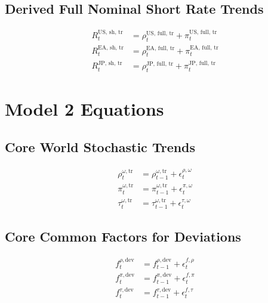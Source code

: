 \documentclass{article}
\begin{document}
\subsection*{Derived Full Nominal Short Rate Trends}
\begin{align}
    R^{\text{US, sh, tr}}_t &= \rho^{\text{US, full, tr}}_t + \pi^{\text{US, full, tr}}_t \\
    R^{\text{EA, sh, tr}}_t &= \rho^{\text{EA, full, tr}}_t + \pi^{\text{EA, full, tr}}_t \\
    R^{\text{JP, sh, tr}}_t &= \rho^{\text{JP, full, tr}}_t + \pi^{\text{JP, full, tr}}_t
\end{align}

\clearpage
\section*{Model 2 Equations} %

\subsection*{Core World Stochastic Trends}
\begin{align}
    \rho^{\omega, \text{tr}}_t &= \rho^{\omega, \text{tr}}_{t-1} + \epsilon^{\rho, \omega}_t \\
    \pi^{\omega, \text{tr}}_t &= \pi^{\omega, \text{tr}}_{t-1} + \epsilon^{\pi, \omega}_t \\
    \tau^{\omega, \text{tr}}_t &= \tau^{\omega, \text{tr}}_{t-1} + \epsilon^{\tau, \omega}_t
\end{align}

\subsection*{Core Common Factors for Deviations}
\begin{align}
    f^{\rho, \text{dev}}_t &= f^{\rho, \text{dev}}_{t-1} + \epsilon^{f, \rho}_t \\
    f^{\pi, \text{dev}}_t &= f^{\pi, \text{dev}}_{t-1} + \epsilon^{f, \pi}_t \\
    f^{\tau, \text{dev}}_t &= f^{\tau, \text{dev}}_{t-1} + \epsilon^{f, \tau}_t
\end{align}
\end{document}
